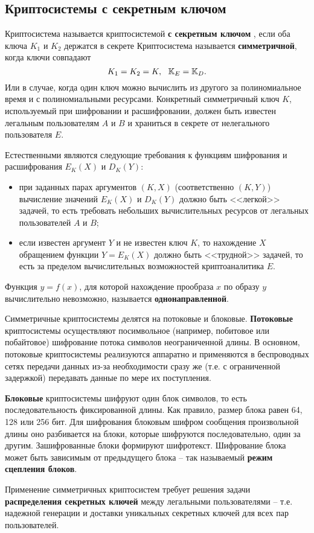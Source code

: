 \subsection{Криптосистемы с секретным ключом}

Криптосистема  называется криптосистемой \textbf{с секретным ключом} , если оба ключа $K_1$ и $K_2$ держатся в секрете
Криптосистема называется \textbf{симметричной}, когда ключи совпадают
    \[ K_1 = K_2 = K, ~~ \mathbb{K}_E = \mathbb{K}_D. \]
    Или в случае, когда один ключ можно вычислить из другого за полиномиальное время и с полиномиальными ресурсами.
Конкретный симметричный ключ $K$, используемый при шифровании и расшифровании, должен быть известен легальным пользователям $A$ и $B$ и храниться в секрете от нелегального пользователя $E$.

Естественными являются следующие требования к функциям шифрования и расшифрования  $E_K(X)$ и $D_K(Y)$:
\begin{itemize}
  \item при заданных парах аргументов $(K,X)$ (соответственно $(K,Y)$) вычисление значений $E_K(X)$ и $D_K(Y)$ должно быть <<легкой>> задачей, то есть требовать небольших вычислительных ресурсов от легальных пользователей $A$ и $B$;
  \item если известен аргумент $Y$ и не известен ключ $K$, то нахождение $X$ обращением  функции $Y = E_K(X)$
      должно быть <<трудной>> задачей, то есть за пределом вычислительных возможностей криптоаналитика $E$.
\end{itemize}

Функция $y = f(x)$, для которой нахождение прообраза $x$ по образу $y$ вычислительно невозможно, называется \textbf{однонаправленной}.

Симметричные криптосистемы делятся на потоковые и блоковые. \textbf{Потоковые} криптосистемы осуществляют посимвольное (например, побитовое или побайтовое) шифрование потока символов неограниченной длины. В основном, потоковые криптосистемы реализуются аппаратно и применяются в беспроводных сетях передачи данных из-за необходимости сразу же (т.е. с ограниченной задержкой) передавать данные по мере их поступления.

\textbf{Блоковые} криптосистемы шифруют один блок символов, то есть последовательность фиксированной длины. Как правило, размер блока равен 64, 128 или 256 бит. Для шифрования блоковым шифром  сообщения произвольной длины оно разбивается на блоки, которые шифруются последовательно, один за другим. Зашифрованные блоки формируют шифротекст. Шифрование блока может быть зависимым от предыдущего блока -- так называемый \textbf{режим сцепления блоков}.

Применение симметричных криптосистем требует решения  задачи \textbf{распределения секретных ключей} между легальными пользователями -- т.е. надежной генерации и доставки уникальных секретных ключей для всех пар пользователей.
